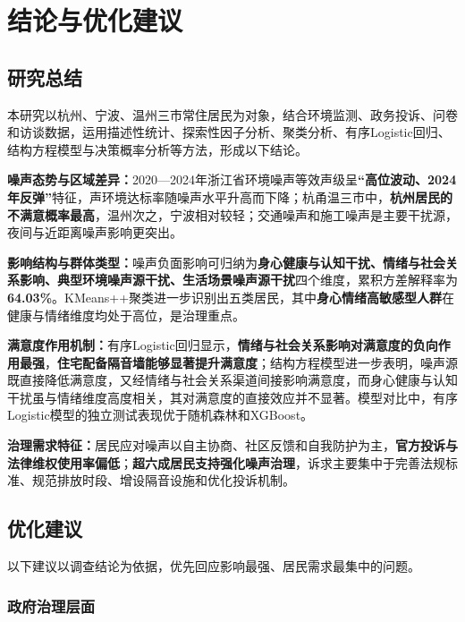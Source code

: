 \section{结论与优化建议}

\subsection{研究总结}

本研究以杭州、宁波、温州三市常住居民为对象，结合环境监测、政务投诉、问卷和访谈数据，运用描述性统计、探索性因子分析、聚类分析、有序Logistic回归、结构方程模型与决策概率分析等方法，形成以下结论。

\textbf{噪声态势与区域差异：}2020—2024年浙江省环境噪声等效声级呈\textbf{“高位波动、2024年反弹”}特征，声环境达标率随噪声水平升高而下降；杭甬温三市中，\textbf{杭州居民的不满意概率最高}，温州次之，宁波相对较轻；交通噪声和施工噪声是主要干扰源，夜间与近距离噪声影响更突出。

\textbf{影响结构与群体类型：}噪声负面影响可归纳为\textbf{身心健康与认知干扰、情绪与社会关系影响、典型环境噪声源干扰、生活场景噪声源干扰}四个维度，累积方差解释率为\textbf{64.03\%}。KMeans++聚类进一步识别出五类居民，其中\textbf{身心情绪高敏感型人群}在健康与情绪维度均处于高位，是治理重点。

\textbf{满意度作用机制：}有序Logistic回归显示，\textbf{情绪与社会关系影响对满意度的负向作用最强}，\textbf{住宅配备隔音墙能够显著提升满意度}；结构方程模型进一步表明，噪声源既直接降低满意度，又经情绪与社会关系渠道间接影响满意度，而身心健康与认知干扰虽与情绪维度高度相关，其对满意度的直接效应并不显著。模型对比中，有序Logistic模型的独立测试表现优于随机森林和XGBoost。

\textbf{治理需求特征：}居民应对噪声以自主协商、社区反馈和自我防护为主，\textbf{官方投诉与法律维权使用率偏低}；\textbf{超六成居民支持强化噪声治理}，诉求主要集中于完善法规标准、规范排放时段、增设隔音设施和优化投诉机制。

\subsection{优化建议}


以下建议以调查结论为依据，优先回应影响最强、居民需求最集中的问题。

\subsubsection{政府治理层面}

